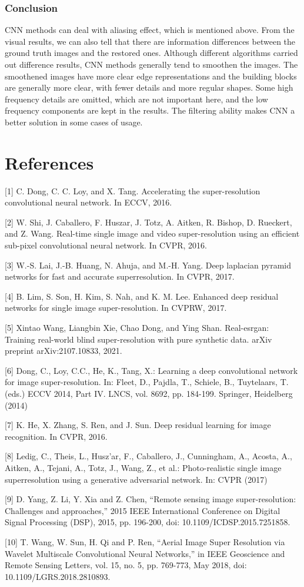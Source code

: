 \documentclass{article}
\begin{document}
  \subsubsection*{Conclusion}
  CNN methods can deal with aliasing effect, which is mentioned above.
  From the visual results, we can also tell that there are information differences between the ground truth images and the restored ones.
  Although different algorithms carried out difference results, CNN methods generally tend to smoothen the images.
  The smoothened images have more clear edge representations and the building blocks are generally more clear, with fewer details and more regular shapes.
  Some high frequency details are omitted, which are not important here, and the low frequency components are kept in the results.
  The filtering ability makes CNN a better solution in some cases of usage.

\section*{References}

[1] C. Dong, C. C. Loy, and X. Tang. Accelerating the super-resolution convolutional neural network. In ECCV, 2016. 

[2] W. Shi, J. Caballero, F. Huszar, J. Totz, A. Aitken, R. Bishop, D. Rueckert, and Z. Wang. Real-time single image and video super-resolution using an efficient sub-pixel convolutional neural network. In CVPR, 2016.

[3] W.-S. Lai, J.-B. Huang, N. Ahuja, and M.-H. Yang. Deep laplacian pyramid networks for fast and accurate superresolution. In CVPR, 2017.

[4] B. Lim, S. Son, H. Kim, S. Nah, and K. M. Lee. Enhanced deep residual networks for single image super-resolution. In CVPRW, 2017.

[5] Xintao Wang, Liangbin Xie, Chao Dong, and Ying Shan. Real-esrgan: Training real-world blind super-resolution with pure synthetic data. arXiv preprint arXiv:2107.10833, 2021.

[6] Dong, C., Loy, C.C., He, K., Tang, X.: Learning a deep convolutional network for image super-resolution. In: Fleet, D., Pajdla, T., Schiele, B., Tuytelaars, T. (eds.) ECCV 2014, Part IV. LNCS, vol. 8692, pp. 184-199. Springer, Heidelberg (2014)

[7] K. He, X. Zhang, S. Ren, and J. Sun. Deep residual learning for image recognition. In CVPR, 2016.

[8] Ledig, C., Theis, L., Husz'ar, F., Caballero, J., Cunningham, A., Acosta, A., Aitken, A., Tejani, A., Totz, J., Wang, Z., et al.: Photo-realistic single image superresolution using a generative adversarial network. In: CVPR (2017)

[9] D. Yang, Z. Li, Y. Xia and Z. Chen, “Remote sensing image super-resolution: Challenges and approaches,” 2015 IEEE International Conference on Digital Signal Processing (DSP), 2015, pp. 196-200, doi: 10.1109/ICDSP.2015.7251858.

[10] T. Wang, W. Sun, H. Qi and P. Ren, “Aerial Image Super Resolution via Wavelet Multiscale Convolutional Neural Networks,” in IEEE Geoscience and Remote Sensing Letters, vol. 15, no. 5, pp. 769-773, May 2018, doi: 10.1109/LGRS.2018.2810893.
\end{document}
